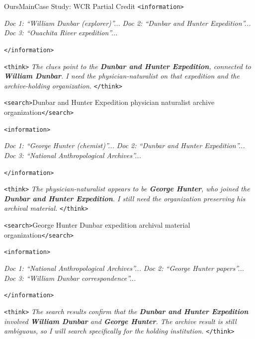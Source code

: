 \begin{casebox}{OursMain}{Case Study: WCR Partial Credit}
\textcolor{TagInfo}{\texttt{<information>}}

\textit{Doc 1: ``William Dunbar (explorer)''...} \textit{Doc 2: ``Dunbar and Hunter Expedition''...} \textit{Doc 3: ``Ouachita River expedition''...}

\textcolor{TagInfo}{\texttt{</information>}}
\vspace{3mm}

\begin{thinkpanel}
\textcolor{TagThink}{\texttt{<think>}} \textit{The clues point to the \colorbox{yellow!30}{\textbf{Dunbar and Hunter Expedition}}, connected to \colorbox{yellow!30}{\textbf{William Dunbar}}. I need the physician-naturalist on that expedition and the archive-holding organization.} \textcolor{TagThink}{\texttt{</think>}}
\end{thinkpanel}

\textcolor{TagSearch}{\texttt{<search>}}Dunbar and Hunter Expedition physician naturalist archive organization\textcolor{TagSearch}{\texttt{</search>}}

\textcolor{TagInfo}{\texttt{<information>}}

\textit{Doc 1: ``George Hunter (chemist)''...} \textit{Doc 2: ``Dunbar and Hunter Expedition''...} \textit{Doc 3: ``National Anthropological Archives''...}

\textcolor{TagInfo}{\texttt{</information>}}
\vspace{3mm}

\begin{thinkpanel}
\textcolor{TagThink}{\texttt{<think>}} \textit{The physician-naturalist appears to be \colorbox{yellow!30}{\textbf{George Hunter}}, who joined the \colorbox{yellow!30}{\textbf{Dunbar and Hunter Expedition}}. I still need the organization preserving his archival material.} \textcolor{TagThink}{\texttt{</think>}}
\end{thinkpanel}

\textcolor{TagSearch}{\texttt{<search>}}George Hunter Dunbar expedition archival material organization\textcolor{TagSearch}{\texttt{</search>}}

\textcolor{TagInfo}{\texttt{<information>}}

\textit{Doc 1: ``National Anthropological Archives''...} \textit{Doc 2: ``George Hunter papers''...} \textit{Doc 3: ``William Dunbar correspondence''...}

\textcolor{TagInfo}{\texttt{</information>}}
\vspace{3mm}

\begin{thinkpanel}
\textcolor{TagThink}{\texttt{<think>}} \textit{The search results confirm that the \colorbox{yellow!30}{\textbf{Dunbar and Hunter Expedition}} involved \colorbox{yellow!30}{\textbf{William Dunbar}} and \colorbox{yellow!30}{\textbf{George Hunter}}. The archive result is still ambiguous, so I will search specifically for the holding institution.} \textcolor{TagThink}{\texttt{</think>}}
\end{thinkpanel}


\end{casebox}
